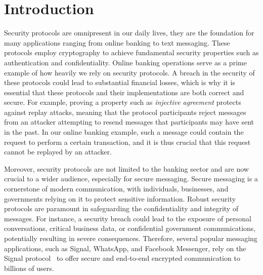 \chapter{Introduction}
\label{chap:introduction}


Security protocols are omnipresent in our daily lives, they are the foundation for many applications ranging from online banking to text messaging. These protocols employ cryptography to achieve fundamental security properties such as authentication and confidentiality.
Online banking operations serve as a prime example of how heavily we rely on security protocols. A breach in the security of these protocols could lead to substantial financial losses, which is why it is essential that these protocols and their implementations are both correct and secure.
For example, proving a property such as \emph{injective agreement} protects against replay attacks, meaning that the protocol participants reject messages from an attacker attempting to resend messages that participants may have sent in the past. In our online banking example, such a message could contain the request to perform a certain transaction, and it is thus crucial that this request cannot be replayed by an attacker.

Moreover, security protocols are not limited to the banking sector and are now crucial to a wider audience, especially for secure messaging.
Secure messaging is a cornerstone of modern communication, with individuals, businesses, and governments relying on it to protect sensitive information.
Robust security protocols are paramount in safeguarding the confidentiality and integrity of messages.
For instance, a security breach could lead to the exposure of personal conversations, critical business data, or confidential government communications, potentially resulting in severe consequences.
Therefore, several popular messaging applications, such as Signal, WhatsApp, and Facebook Messenger, rely on the Signal protocol~\cite{marlinspike2016x3dh} to offer secure and end-to-end encrypted communication to billions of users.

